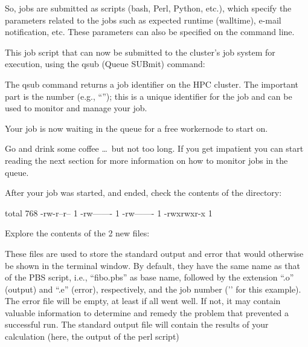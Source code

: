 So, jobs are submitted as scripts (bash, Perl, Python, etc.), which specify the
parameters related to the jobs such as expected runtime (walltime), e-mail
notification, etc. These parameters can also be specified on the command line.

This job script that can now be submitted to the cluster's job system for
execution, using the qsub (Queue SUBmit) command:

\begin{prompt}
\end{prompt}

The qsub command returns a job identifier on the HPC cluster. The important
part is the number (e.g., ``\jobnumber''); this is a unique identifier for the job
and can be used to monitor and manage your job.

Your job is now waiting in the queue for a free workernode to start on.

Go and drink some coffee \dots\ but not too long. If you get impatient you can
start reading the next section for more information on how to monitor jobs in the queue.

After your job was started, and ended, check the contents of the directory:

\begin{prompt}
total 768
-rw-r--r-- 1 %
-rw------- 1 %
-rw------- 1 %
-rwxrwxr-x 1 %
\end{prompt}

Explore the contents of the 2 new files:

\begin{prompt}
\end{prompt}

These files are used to store the standard output and error that would
otherwise be shown in the terminal window. By default, they have the same name
as that of the PBS script, i.e., ``fibo.pbs'' as base name, followed by the
extension ``.o'' (output) and ``.e'' (error), respectively, and the job number
('\jobnumber' for this example). The error file will be empty, at least if all went
well. If not, it may contain valuable information to determine and remedy the
problem that prevented a successful run. The standard output file will contain
the results of your calculation (here, the output of the perl script)

